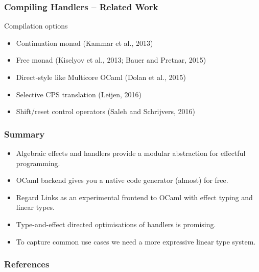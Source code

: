 \documentclass[10pt,compress]{beamer}
\begin{document}
\begin{frame}
  \frametitle{Compiling Handlers -- Related Work}
Compilation options
\begin{itemize}
  \item Continuation monad (Kammar et al., 2013)
  \item Free monad (Kiselyov et al., 2013; Bauer and Pretnar, 2015)
  \item Direct-style like Multicore OCaml (Dolan et al., 2015)
  \item Selective CPS translation (Leijen, 2016)
  \item Shift/reset control operators (Saleh and Schrijvers, 2016)
\end{itemize}
\end{frame}

\begin{frame}
  \frametitle{Summary}
\begin{itemize}
\item Algebraic effects and handlers provide a modular abstraction for
  effectful programming.
\item OCaml backend gives you a native code generator (almost) for free.
\item Regard Links as an experimental frontend to OCaml with effect
  typing and linear types.
\item Type-and-effect directed optimisations of handlers is promising.
  \item To capture common use cases we need a more expressive linear type system.
\end{itemize}
\end{frame}

%


\begin{frame}[allowframebreaks]
  \frametitle{References}
  \nocite{*}
  
\end{frame}
\end{document}

